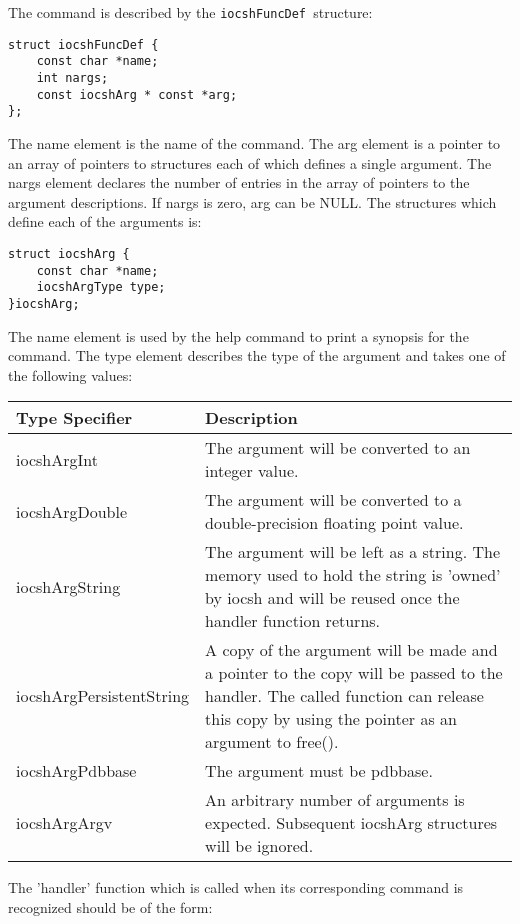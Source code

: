 The command is described by the  \verb|iocshFuncDef |structure:

\begin{verbatim}struct iocshFuncDef {
    const char *name;
    int nargs;
    const iocshArg * const *arg;
};
\end{verbatim}The name element is the name of the command.  The arg element is a pointer to an array of pointers to structures each of 
which defines a single argument.  The nargs element declares the number of entries in the array of pointers to the 
argument descriptions.  If nargs is zero, arg can be NULL.  The structures which define each of the arguments is:

\begin{verbatim}struct iocshArg {
    const char *name;
    iocshArgType type;
}iocshArg;
\end{verbatim}The name element is used by the help command to print a synopsis for the command.  The type element describes the type 
of the argument and takes one of the following values:
\begin{center}\begin{longtable}{p{1.5in}p{3.76in}}
Type Specifier & Description\\
\hline
iocshArgInt & The argument will be converted to an integer value.\\
iocshArgDouble & The argument will be converted to a double-precision floating point value.\\
iocshArgString & The argument will be left as a string.  The memory used to hold the string is 'owned' by iocsh and will be reused once the handler function returns.\\
iocshArgPersistentString & A copy of the argument will be made and a pointer to the copy will be passed to the handler.  The called function can release this copy by using the pointer as an argument to free().\\
iocshArgPdbbase & The argument must be pdbbase.\\
iocshArgArgv & An arbitrary number of arguments is expected.  Subsequent iocshArg structures will be ignored.
\end{longtable}\end{center}


The 'handler' function which is called when its corresponding command is recognized should be of the form:

